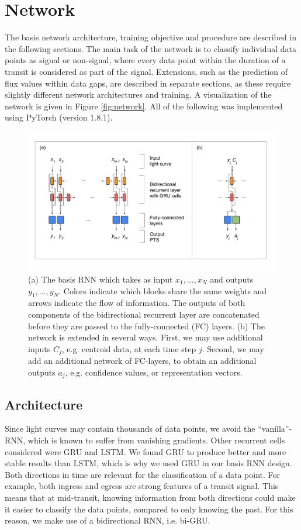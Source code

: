 
\section{Network}
\label{sec:network}

The basis network architecture, training objective and procedure are described in the following sections. The main task of the network is to classify individual data points as signal or non-signal, where every data point within the duration of a transit is considered as part of the signal. Extensions, such as the prediction of flux values within data gaps, are described in separate sections, as these require slightly different network architectures and training. A visualization of the network is given in Figure \ref{fig:network}. All of the following was implemented using PyTorch (version 1.8.1). 

\begin{figure}
    \centering
    \includegraphics[width=0.7\linewidth]{Methodology/Figures/network_drawing.pdf}
    \caption{(a) The basis RNN which takes as input $x_1,\dots,x_{N}$ and outputs $y_1,\dots,y_{N}$. Colors indicate which blocks share the same weights and arrows indicate the flow of information. The outputs of both components of the bidirectional recurrent layer are concatenated before they are passed to the fully-connected (FC) layers. (b) The network is extended in several ways. First, we may use additional inputs $C_j$, e.g. centroid data, at each time step $j$. Second, we may add an additional network of FC-layers, to obtain an additional outputs $a_j$, e.g. confidence values, or representation vectors. }
    \label{fig:my_label}
\end{figure}

\subsection{Architecture}
\label{sec:architecture}

Since light curves may contain thousands of data points, we avoid the ``vanilla''-RNN, which is known to suffer from vanishing gradients. Other recurrent cells considered were GRU and LSTM. We found GRU to produce better and more stable results than LSTM, which is why we used GRU in our basis RNN design. Both directions in time are relevant for the classification of a data point. For example, both ingress and egress are strong features of a transit signal. This means that at mid-transit, knowing information from both directions could make it easier to classify the data points, compared to only knowing the past. For this reason, we make use of a bidirectional RNN, i.e. bi-GRU.

